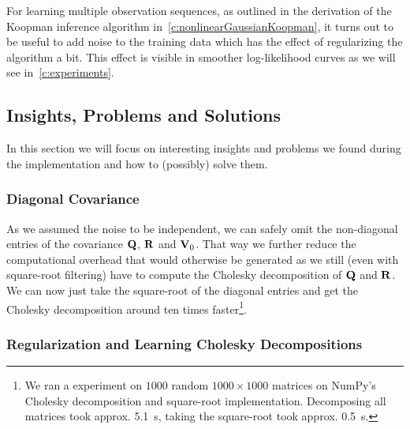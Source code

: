 	For learning multiple observation sequences, as outlined in the derivation of the Koopman inference algorithm in~\autoref{c:nonlinearGaussianKoopman}, it turns out to be useful to add noise to the training data which has the effect of regularizing the algorithm a bit. This effect is visible in smoother log-likelihood curves as we will see in~\autoref{c:experiments}.


	\subsection{Insights, Problems and Solutions}
		In this section we will focus on interesting insights and problems we found during the implementation and how to (possibly) solve them.

		\subsubsection{Diagonal Covariance}
			As we assumed the noise to be independent, we can safely omit the non-diagonal entries of the covariance \( \boldsymbol{\mathrm{Q}} \), \( \boldsymbol{\mathrm{R}} \) and \( \boldsymbol{\mathrm{V}}_0 \). That way we further reduce the computational overhead that would otherwise be generated as we still (even with square-root filtering) have to compute the Cholesky decomposition of \( \boldsymbol{\mathrm{Q}} \) and \( \boldsymbol{\mathrm{R}} \). We can now just take the square-root of the diagonal entries and get the Cholesky decomposition around ten times faster\footnote{We ran a experiment on \(1000\) random \( 1000 \times 1000 \) matrices on NumPy's~\cite{harrisArrayProgrammingNumPy2020} Cholesky decomposition and square-root implementation. Decomposing all matrices took approx. \SI{5.1}{\second}, taking the square-root took approx. \SI{0.5}{\second}.}.


		\subsubsection{Regularization and Learning Cholesky Decompositions}
			\label{subsubsec:implRegularization}

